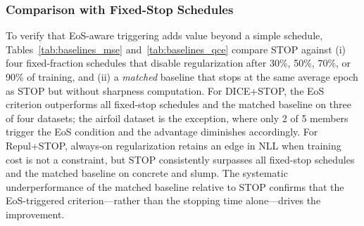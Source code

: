 \documentclass[sigconf]{acmart}
\begin{document}
\subsubsection{Comparison with Fixed-Stop Schedules}

To verify that EoS-aware triggering adds value beyond a simple schedule, Tables~\ref{tab:baselines_mse} and~\ref{tab:baselines_qce} compare STOP against (i) four fixed-fraction schedules that disable regularization after 30\%, 50\%, 70\%, or 90\% of training, and (ii) a \emph{matched} baseline that stops at the same average epoch as STOP but without sharpness computation.
For DICE+STOP, the EoS criterion outperforms all fixed-stop schedules and the matched baseline on three of four datasets; the airfoil dataset is the exception, where only 2 of 5 members trigger the EoS condition and the advantage diminishes accordingly.
For Repul+STOP, always-on regularization retains an edge in NLL when training cost is not a constraint, but STOP consistently surpasses all fixed-stop schedules and the matched baseline on concrete and slump.
The systematic underperformance of the matched baseline relative to STOP confirms that the EoS-triggered criterion---rather than the stopping time alone---drives the improvement.
\end{document}
